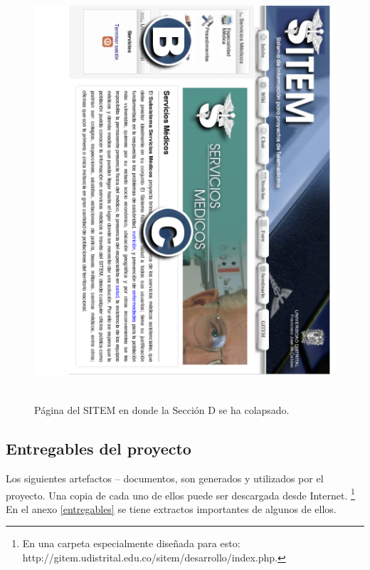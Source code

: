 \begin{figure}
 \centering
 \includegraphics[width=156mm, height=156mm]{seccion_colapsada.png}
 \caption{Página del SITEM en donde la Sección D se ha colapsado.}
 \label{seccion_colapsada}
\end{figure}

\subsection{Entregables del proyecto}

Los siguientes artefactos – documentos, son generados y utilizados por el proyecto. Una copia de cada uno de ellos puede ser descargada desde Internet. \footnote{En una carpeta especialmente diseñada para esto: http://gitem.udistrital.edu.co/sitem/desarrollo/index.php.} En el anexo \ref{entregables} se tiene extractos importantes de algunos de ellos.

